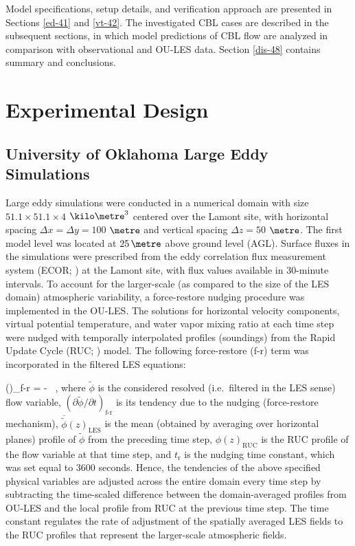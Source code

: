 Model specifications, setup details, and verification approach are presented in Sections \autoref{ed-41} and \autoref{vt-42}. The investigated CBL cases are described in the subsequent sections, in which model predictions of CBL flow are analyzed in comparison with observational and OU-LES data. Section \autoref{dis-48} contains summary and conclusions.

\section{Experimental Design}
\label{ed-41}

\subsection{University of Oklahoma Large Eddy Simulations}
\label{les-411}

Large eddy simulations were conducted in a numerical domain with size $51.1 \times 51.1 \times 4$ $\kilo\metre^3$ centered over the Lamont site, with horizontal spacing $\Delta x = \Delta y = 100$ $\metre$ and vertical spacing $\Delta z = 50$ $\metre$. The first model level was located at $25\, \metre$ above ground level (AGL). Surface fluxes in the simulations were prescribed from the eddy correlation flux measurement system (ECOR; \citealt{armECOR}) at the Lamont site, with flux values available in 30-minute intervals. To account for the larger-scale (as compared to the size of the LES domain) atmospheric variability, a force-restore nudging procedure was implemented in the OU-LES. The solutions for horizontal velocity components, virtual potential temperature, and water vapor mixing ratio at each time step were nudged with temporally interpolated profiles (soundings) from the Rapid Update Cycle (RUC; \citealt{RUC}) model. The following force-restore (f-r) term was incorporated in the filtered LES equations:


\be
\left(\right)_{\textrm{f-r}} = -  \mbox{ ,}
\ee
\noindent
where $\tilde{\phi}$ is the considered resolved (i.e.\ filtered in the LES sense) flow variable, $\left(\partial \tilde{\phi} / \partial t\right)_{\textrm{f-r}}$ is its tendency due to the nudging (force-restore mechanism), $\overline{\tilde{\phi}}(z)_{\textrm{LES}}$ is the mean (obtained by averaging over horizontal planes) profile of $\tilde{\phi}$ from the preceding time step, $\phi(z)_{\textrm{RUC}}$ is the RUC profile of the flow variable at that time step, and $t_{\textrm{r}}$ is the nudging time constant, which was set equal to $3600$ seconds. Hence, the tendencies of the above specified physical variables are adjusted across the entire domain every time step by subtracting the time-scaled difference between the domain-averaged profiles from OU-LES and the local profile from RUC at the previous time step. The time constant regulates the rate of adjustment of the spatially averaged LES fields to the RUC profiles that represent the larger-scale atmospheric fields.

